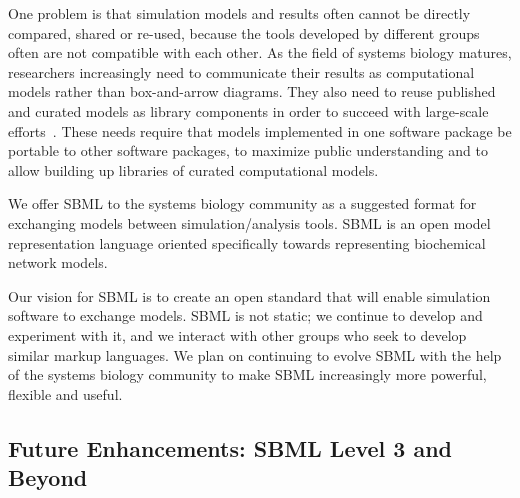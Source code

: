 \documentclass[10pt,twocolumntoc]{cekarticle}
\begin{document}
One problem is that simulation models and results often cannot be directly
compared, shared or re-used, because the tools developed by different
groups often are not compatible with each other.  As the field of systems
biology matures, researchers increasingly need to communicate their results
as computational models rather than box-and-arrow diagrams.  They also need
to reuse published and curated models as library components in order to
succeed with large-scale efforts~\cite[e.g., the Alliance for Cellular
Signaling;][]{gilman:2000,smaglik:2000}.  These needs require that models
implemented in one software package be portable to other software packages,
to maximize public understanding and to allow building up libraries of
curated computational models.

We offer SBML to the systems biology community as a suggested
format for exchanging models between simulation/analysis tools.
SBML is an open model representation language oriented
specifically towards representing biochemical network models.

Our vision for SBML is to create an open standard that will enable
simulation software to exchange models.  SBML is not static; we continue to
develop and experiment with it, and we interact with other groups who seek
to develop similar markup languages.  We plan on continuing to evolve SBML
with the help of the systems biology community to make SBML increasingly
more powerful, flexible and useful.


\subsection{Future Enhancements: SBML Level 3 and Beyond}
\label{sec:level-3}
\end{document}
